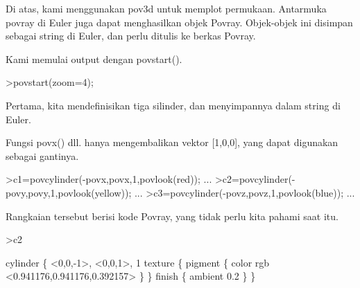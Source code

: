 \documentclass[a4paper,10pt]{article}
\begin{document}
\begin{eulernotebook}
\begin{eulercomment}
\begin{eulercomment}
\begin{eulercomment}
\begin{eulercomment}
\begin{eulercomment}
\begin{eulercomment}
\begin{eulercomment}
\begin{eulercomment}
\begin{eulercomment}
\begin{eulercomment}
\begin{eulercomment}
\begin{eulercomment}
\begin{eulercomment}
\begin{eulercomment}
\begin{eulercomment}
\begin{eulercomment}
\begin{eulercomment}
\begin{eulercomment}
\begin{eulercomment}
\begin{eulercomment}
\begin{eulercomment}
\begin{eulercomment}
\begin{eulercomment}
\begin{eulercomment}
\begin{eulercomment}
\begin{eulercomment}
\begin{eulercomment}
\begin{eulercomment}
\begin{eulercomment}
\begin{eulercomment}
\begin{eulercomment}
\begin{eulercomment}
\begin{eulercomment}
\begin{eulercomment}
\begin{eulercomment}
\begin{eulercomment}
\begin{eulercomment}
\begin{eulercomment}
\begin{eulercomment}
\begin{eulercomment}
\begin{eulercomment}
Di atas, kami menggunakan pov3d untuk memplot permukaan. Antarmuka
povray di Euler juga dapat menghasilkan objek Povray. Objek-objek ini
disimpan sebagai string di Euler, dan perlu ditulis ke berkas Povray.

Kami memulai output dengan povstart().
\end{eulercomment}
\begin{eulerprompt}
>povstart(zoom=4);
\end{eulerprompt}
\begin{eulercomment}
Pertama, kita mendefinisikan tiga silinder, dan menyimpannya dalam
string di Euler.

Fungsi povx() dll. hanya mengembalikan vektor [1,0,0], yang dapat
digunakan sebagai gantinya.
\end{eulercomment}
\begin{eulerprompt}
>c1=povcylinder(-povx,povx,1,povlook(red)); ...
>c2=povcylinder(-povy,povy,1,povlook(yellow)); ...
>c3=povcylinder(-povz,povz,1,povlook(blue)); ...
\end{eulerprompt}
\begin{eulercomment}
Rangkaian tersebut berisi kode Povray, yang tidak perlu kita pahami
saat itu.
\end{eulercomment}
\begin{eulerprompt}
>c2
\end{eulerprompt}
\begin{euleroutput}
  cylinder \{ <0,0,-1>, <0,0,1>, 1
   texture \{ pigment \{ color rgb <0.941176,0.941176,0.392157> \}  \} 
   finish \{ ambient 0.2 \} 
   \}
\end{euleroutput}

\end{eulercomment}
\end{eulercomment}
\end{eulercomment}
\end{eulercomment}
\end{eulercomment}
\end{eulercomment}
\end{eulercomment}
\end{eulercomment}
\end{eulercomment}
\end{eulercomment}
\end{eulercomment}
\end{eulercomment}
\end{eulercomment}
\end{eulercomment}
\end{eulercomment}
\end{eulercomment}
\end{eulercomment}
\end{eulercomment}
\end{eulercomment}
\end{eulercomment}
\end{eulercomment}
\end{eulercomment}
\end{eulercomment}
\end{eulercomment}
\end{eulercomment}
\end{eulercomment}
\end{eulercomment}
\end{eulercomment}
\end{eulercomment}
\end{eulercomment}
\end{eulercomment}
\end{eulercomment}
\end{eulercomment}
\end{eulercomment}
\end{eulercomment}
\end{eulercomment}
\end{eulercomment}
\end{eulercomment}
\end{eulercomment}
\end{eulercomment}
\end{eulernotebook}
\end{document}
